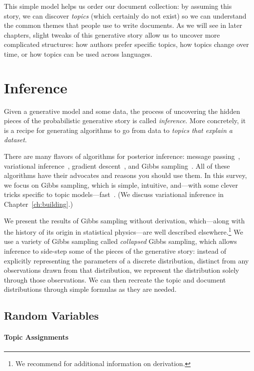 This simple model helps us order our document collection: by assuming this story, we
can discover \emph{topics} (which certainly do not exist) so we can understand
the common themes that people use to write documents.  As we will see in later
chapters, slight tweaks of this generative story allow us to uncover more
complicated structures: how authors prefer specific topics, how topics change
over time, or how topics can be used across languages.

\section{Inference}

Given a generative model and some data, the process of uncovering the hidden
 pieces of the probabilistic generative story is called \emph{inference}.  More
concretely, it is a recipe for generating algorithms to go from data to
\emph{topics that explain a dataset}.

There are many flavors of algorithms for posterior inference: message
passing~\citep{zeng-13}, variational inference~\citep{blei-03},
gradient descent~\citep{hoffman-10}, and Gibbs
sampling~\citep{griffiths-04}.  All of these algorithms have their
advocates and reasons you should use them.  In this survey, we focus
on Gibbs sampling, which is simple, intuitive, and---with some clever
tricks specific to topic models---fast~\citep{yao-09}.  (We discuss
variational inference in Chapter~\ref{ch:building}.)

We present the results of Gibbs sampling without derivation,
which---along with the history of its origin in statistical
physics---are well described elsewhere.\footnote{We recommend
  \citet{resnik-09} for additional information on derivation.} We use
a variety of Gibbs sampling called \emph{collapsed} Gibbs sampling,
which allows inference to side-step some of the pieces of the
generative story: instead of explicitly representing the parameters of
a discrete distribution, distinct from any observations drawn from
that distribution, we represent the distribution solely through those
observations.  We can then recreate the topic and document
distributions through simple formulas as they are needed.

\subsection{Random Variables}

\paragraph{Topic Assignments}

